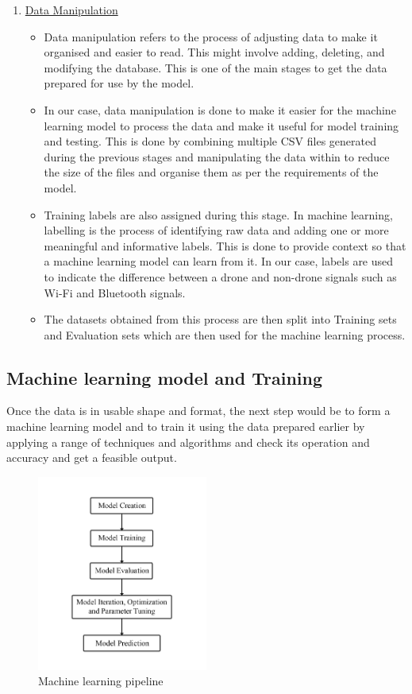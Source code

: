 \begin{enumerate}
  \item \underline {Data Manipulation}
\begin{itemize}
   \item Data manipulation refers to the process of adjusting data to make it organised and easier to read. This might involve adding, deleting, and modifying the database. This is one of the main stages to get the data prepared for use by the model.
    \item In our case, data manipulation is done to make it easier for the machine learning model to process the data and make it useful for model training and testing. This is done by combining multiple CSV files generated during the previous stages and manipulating the data within to reduce the size of the files and organise them as per the requirements of the model.
    \item Training labels are also assigned during this stage. In machine learning, labelling is the process of identifying raw data and adding one or more meaningful and informative labels. This is done to provide context so that a machine learning model can learn from it. In our case, labels are used to indicate the difference between a drone and non-drone signals such as Wi-Fi and Bluetooth signals.
    \item The datasets obtained from this process are then split into Training sets and Evaluation sets which are then used for the machine learning process.
\end{itemize}
    \end{enumerate}

    \subsection{Machine learning model and Training}

    Once the data is in usable shape and format, the next step would be to form a machine learning model and to train it using the data prepared earlier by applying a range of techniques and algorithms and check its operation and accuracy and get a feasible output.

    \begin{figure}[H]
      \centering
      \includegraphics[width=0.5\textwidth]{MachineLearningModelAndTaining.png}
      \caption{Machine learning pipeline}
    \end{figure}

